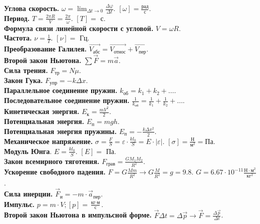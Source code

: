 \documentclass{article}
\begin{document}
	\textbf{Углова скорость.} $\omega = \lim_{\varDelta t \rightarrow 0} \frac{\varDelta \varphi}{\varDelta t}$. $[\omega] = \frac{\text{рад}}{\text{с}}$. \\
	\textbf{Период.} $T = \frac{2 \pi R}{V} = \frac{2 \pi}{\omega}$. $[T] =$ с. \\
	\textbf{Формула связи линейной скорости с угловой.} $V = \omega R$. \\
	\textbf{Частота.} $\nu = \frac{1}{T}$. $[\nu] =$ Гц. \\
	\textbf{Преобразование Галилея.} $\vec{V_{\text{абс}}} = \vec{V_{\text{относ}}} + \vec{V_{\text{пер}}}$. \\
	\textbf{Второй закон Ньютона.} $\sum\vec{F} = m\vec{a}$. \\
	\textbf{Сила трения.} $F_{\text{тр}} = N \mu$. \\
	\textbf{Закон Гука.} $F_{\text{упр}} = -k \varDelta x$. \\
	\textbf{Параллельное соединение пружин.} $k_{\text{об}} = k_1 + k_2 + \dots$. \\
	\textbf{Последовательное соединение пружин.} $\frac{1}{k_{\text{об}}} = \frac{1}{k_1} + \frac{1}{k_2} + \dots$. \\
	\textbf{Кинетическая энергия.} $E_{\text{к}} = \frac{mV^2}{2}$. \\
	\textbf{Потенциальная энергия.} $E_{\text{п}} = mgh$. \\
	\textbf{Потенциальная энергия пружины.} $E_{\text{п}} = -\frac{k \varDelta x^2}{2}$. \\
	\textbf{Механическое напряжение.} $\sigma = \frac{F}{S} = \varepsilon \cdot \frac{kl_0}{S} = E \cdot |\varepsilon|$. $[\sigma] = \frac{\text{Н}}{\text{м}^2} = \text{Па}$. \\
	\textbf{Модуль Юнга}. $E = \frac{kl_0}{S}$. $[E] =$ Па. \\
	\textbf{Закон всемирного тяготения.} $F_{\text{грав}} = \frac{GM_1M_2}{R^2}$. \\
	\textbf{Ускорение свободного падения.} $F = G \frac{Mm}{R^2} \rightarrow G \frac{M}{R^2} = g = 9.8$. $G = 6.67 \cdot 10^{-11} \frac{\text{Н} \cdot \text{м}^2}{\text{кг}^2}$. \\
	\textbf{Сила инерции.} $\vec{F}_{\text{и}} = -m \cdot \vec{a}_{\text{пер}}$. \\
	\textbf{Импульс.} $p = m \cdot V; [p] = \frac{\text{кг} \cdot \text{м}}{\text{с}}$. \\
	\textbf{Второй закон Ньютона в импульсной форме.} $\vec{F} \varDelta t = \varDelta \vec{p} \rightarrow \vec{F} = \frac{\varDelta \vec{p}}{\varDelta t}$. \\
\end{document}
